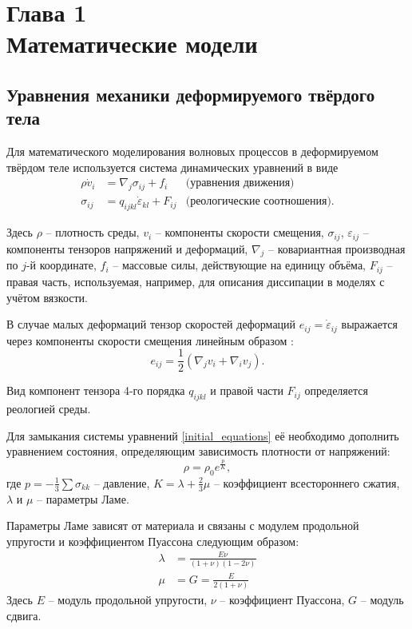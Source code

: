 \section*{Глава 1\\Математические модели}
\setcounter{section}{1}
\setcounter{subsection}{0}

\subsection{Уравнения механики деформируемого твёрдого тела}
Для математического моделирования волновых процессов в деформируемом твёрдом
теле используется система динамических уравнений \cite{novatsky,sedov} в виде
\begin{align}
\label{initial_equations}
\rho\dot{v}_i &= \nabla_j\sigma_{ij}+f_i & \textrm{(уравнения движения)}\nonumber\\
\sigma_{ij} &= q_{ijkl}\dot{\varepsilon}_{kl}+F_{ij} & \textrm{(реологические
соотношения).}
\end{align}

Здесь $\rho$ – плотность среды, $v_i$ – компоненты скорости смещения,
$\sigma_{ij}$, $\varepsilon_{ij}$ -- компоненты тензоров напряжений и деформаций,
$\nabla_j$ – ковариантная производная по $j$-й координате, $f_i$ – массовые
силы, действующие на единицу объёма, $F_{ij}$ -- правая часть, используемая, например, для описания диссипации в моделях с учётом вязкости.

В случае малых деформаций тензор скоростей деформаций $e_{ij}=\dot{\varepsilon}_{ij}$ 
выражается через компоненты скорости смещения линейным образом \cite{landau_lifshits}:
\begin{equation}
e_{ij}=\frac{1}{2}(\nabla_j v_i+\nabla_i v_j).
\end{equation}

Вид компонент тензора 4-го порядка $q_{ijkl}$ и правой части $F_{ij}$ определяется реологией среды.

Для замыкания системы уравнений \ref{initial_equations} её необходимо дополнить
уравнением состояния, определяющим зависимость плотности от напряжений:
\begin{equation}
\rho=\rho_0e^{\frac{p}{K}},
\end{equation}
где $p=-\frac{1}{3}\sum\sigma_{kk}$ -- давление, $K=\lambda+\frac{2}{3}\mu$ --
коэффициент всестороннего сжатия, $\lambda$ и $\mu$ -- параметры Ламе.

Параметры Ламе зависят от материала и связаны с модулем продольной упругости и коэффициентом Пуассона следующим образом:
\begin{align}
\label{lame_parameters}
\lambda &= \frac{E\nu}{(1+\nu)(1-2\nu)}
\nonumber\\
\mu &= G=\frac{E}{2(1+\nu)}
\end{align}
Здесь $E$ -- модуль продольной упругости, $\nu$ -- коэффициент Пуассона, $G$ -- модуль сдвига.

